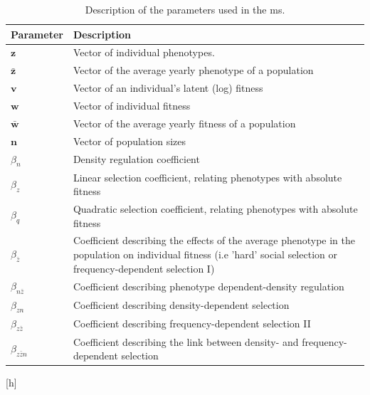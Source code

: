 \documentclass{article}
\begin{document}
\begin{table} 	
	\begin{singlespace}
		
		\begin{tabular}{ l p{13cm}} 
			\hline
			
			\textbf{Parameter} & \textbf{Description} \\ [2pt]
			\hline
			$\bm{z}$        & Vector of individual phenotypes. \\ [2pt]
			$\bar{\bm{z}}$  & Vector of the average yearly phenotype of a population\\ [2pt]
			$\bm{v}$        & Vector of an individual's latent (log) fitness \\ [2pt]
			$\bm{w}$        & Vector of individual fitness \\ [2pt]
			$\bar{\bm{w}}$  & Vector of the average yearly fitness of a population\\ [2pt]
			$\bm{n}$        & Vector of population sizes \\ [2pt]
			$\beta_n$              & Density regulation coefficient \\ [2pt]
			$\beta_z$              & Linear selection coefficient, relating phenotypes with absolute fitness \\ [2pt]
			$\beta_q$              & Quadratic selection coefficient, relating phenotypes with absolute fitness \\ [2pt]
			$\beta_{\bar{z}}$      & Coefficient describing the effects of the average phenotype in the population on individual fitness (i.e 'hard' social selection or frequency-dependent selection I) \\ [2pt]
			$\beta_{n\bar{z}}$     & Coefficient describing phenotype dependent-density regulation \\ [2pt]
			$\beta_{zn}$           & Coefficient describing density-dependent selection \\ 
			$\beta_{z\bar{z}}$     & Coefficient describing frequency-dependent selection II \\ [2pt]
			$\beta_{z\bar{z}n}$    & Coefficient describing the link between density- and frequency-dependent selection\\ [2pt]
			\hline
		\end{tabular}
		\caption{Description of the parameters used in the ms.}
	\end{singlespace}
\end{table}

\newpage
\renewcommand\tablename{Table B3.} \let\nobreakspace\relax  	 \label{Table B2} [h]
\end{document}
